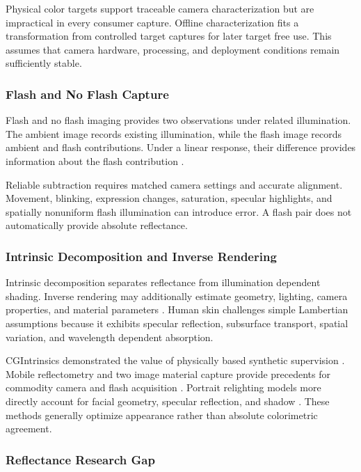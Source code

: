 \documentclass[12pt]{article}
\begin{document}
Physical color targets support traceable camera characterization but are impractical in every consumer capture. Offline characterization fits a transformation from controlled target captures for later target free use. This assumes that camera hardware, processing, and deployment conditions remain sufficiently stable.

\subsubsection{Flash and No Flash Capture}

Flash and no flash imaging provides two observations under related illumination. The ambient image records existing illumination, while the flash image records ambient and flash contributions. Under a linear response, their difference provides information about the flash contribution \cite{dicarlo2001,petschnigg2004,lu2006,hui2016,hui2018,maralan2023}.

Reliable subtraction requires matched camera settings and accurate alignment. Movement, blinking, expression changes, saturation, specular highlights, and spatially nonuniform flash illumination can introduce error. A flash pair does not automatically provide absolute reflectance.

\subsubsection{Intrinsic Decomposition and Inverse Rendering}

Intrinsic decomposition separates reflectance from illumination dependent shading. Inverse rendering may additionally estimate geometry, lighting, camera properties, and material parameters \cite{garces2022}. Human skin challenges simple Lambertian assumptions because it exhibits specular reflection, subsurface transport, spatial variation, and wavelength dependent absorption.

CGIntrinsics demonstrated the value of physically based synthetic supervision \cite{li2018cgintrinsics}. Mobile reflectometry and two image material capture provide precedents for commodity camera and flash acquisition \cite{riviere2016,aittala2015}. Portrait relighting models more directly account for facial geometry, specular reflection, and shadow \cite{nestmeyer2020,wang2020portrait}. These methods generally optimize appearance rather than absolute colorimetric agreement.

\subsubsection{Reflectance Research Gap}
\end{document}
